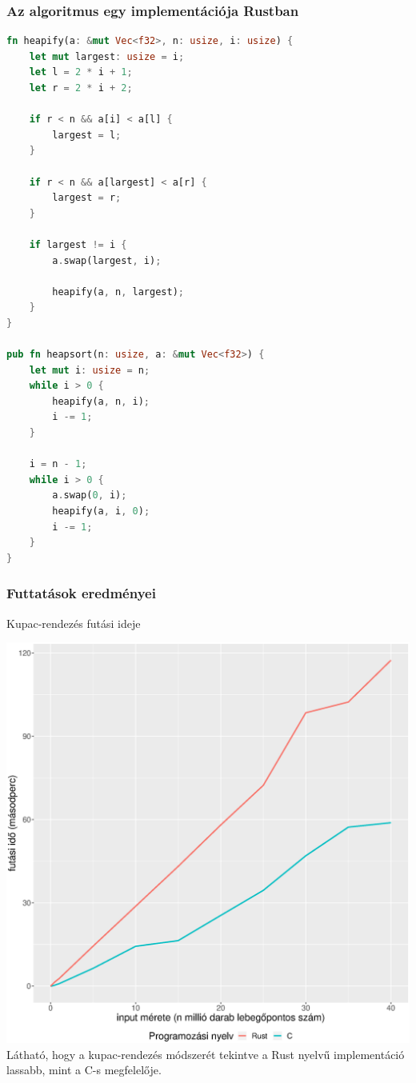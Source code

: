 \subsubsection{Az algoritmus egy implementációja Rustban}
\begin{lstlisting}[language=Rust]
fn heapify(a: &mut Vec<f32>, n: usize, i: usize) {
    let mut largest: usize = i;
    let l = 2 * i + 1;
    let r = 2 * i + 2;

    if r < n && a[i] < a[l] {
        largest = l;
    }

    if r < n && a[largest] < a[r] {
        largest = r;
    }

    if largest != i {
        a.swap(largest, i);

        heapify(a, n, largest);
    }
}

pub fn heapsort(n: usize, a: &mut Vec<f32>) {
    let mut i: usize = n;
    while i > 0 {
        heapify(a, n, i);
        i -= 1;
    }

    i = n - 1;
    while i > 0 {
        a.swap(0, i);
        heapify(a, i, 0);
        i -= 1;
    }
}
\end{lstlisting}
\subsubsection{Futtatások eredményei}
Kupac-rendezés futási ideje

\includegraphics[width=15.5cm]{kepek/heap_sort_run.eps}
Látható, hogy a kupac-rendezés módszerét tekintve a Rust nyelvű implementáció lassabb, mint a C-s megfelelője.

